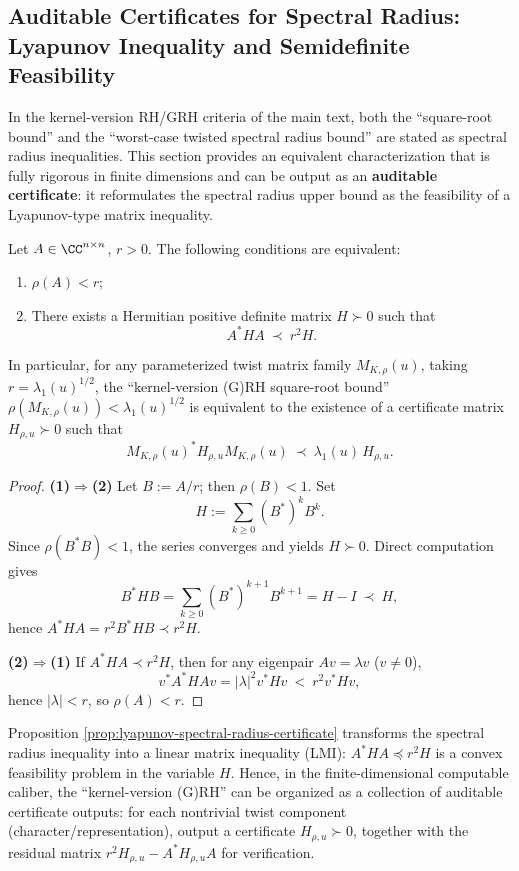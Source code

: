 \subsection{Auditable Certificates for Spectral Radius: Lyapunov Inequality and Semidefinite Feasibility}\label{app:op-algebra-lyapunov}
In the kernel-version RH/GRH criteria of the main text, both the ``square-root bound'' and the ``worst-case twisted spectral radius bound'' are stated as spectral radius inequalities.
This section provides an equivalent characterization that is fully rigorous in finite dimensions and can be output as an \textbf{auditable certificate}: it reformulates the spectral radius upper bound as the feasibility of a Lyapunov-type matrix inequality.

\begin{proposition}\label{prop:lyapunov-spectral-radius-certificate}
Let $A\in\CC^{n\times n}$, $r>0$. The following conditions are equivalent:
\begin{enumerate}
  \item $\rho(A)<r$;
  \item There exists a Hermitian positive definite matrix $H\succ 0$ such that
  \[
  \boxed{\;
  A^\ast H A\ \prec\ r^2 H.
  \;}
  \]
\end{enumerate}
In particular, for any parameterized twist matrix family $M_{K,\rho}(u)$, taking $r=\lambda_1(u)^{1/2}$, the ``kernel-version (G)RH square-root bound''
\(
\rho(M_{K,\rho}(u))<\lambda_1(u)^{1/2}
\)
is equivalent to the existence of a certificate matrix $H_{\rho,u}\succ 0$ such that
\[
M_{K,\rho}(u)^\ast H_{\rho,u} M_{K,\rho}(u)\ \prec\ \lambda_1(u)\,H_{\rho,u}.
\]
\end{proposition}
\begin{proof}
\textbf{(1)$\Rightarrow$(2)} Let $B:=A/r$; then $\rho(B)<1$. Set
\[
H:=\sum_{k\ge 0}(B^\ast)^k B^k.
\]
Since $\rho(B^\ast B)<1$, the series converges and yields $H\succ 0$. Direct computation gives
\[
B^\ast H B
=\sum_{k\ge 0}(B^\ast)^{k+1}B^{k+1}
=H-I\ \prec\ H,
\]
hence $A^\ast H A=r^2 B^\ast H B\prec r^2 H$.

\textbf{(2)$\Rightarrow$(1)} If $A^\ast H A\prec r^2 H$, then for any eigenpair $Av=\lambda v$ ($v\neq 0$),
\[
v^\ast A^\ast H A v=|\lambda|^2 v^\ast H v\ <\ r^2 v^\ast H v,
\]
hence $|\lambda|<r$, so $\rho(A)<r$. \qedhere
\end{proof}

\begin{remark}\label{rem:lyapunov-sdp}
Proposition \ref{prop:lyapunov-spectral-radius-certificate} transforms the spectral radius inequality into a linear matrix inequality (LMI):
\(
A^\ast H A\preceq r^2 H
\)
is a convex feasibility problem in the variable $H$. Hence, in the finite-dimensional computable caliber, the ``kernel-version (G)RH'' can be organized as a collection of auditable certificate outputs:
for each nontrivial twist component (character/representation), output a certificate $H_{\rho,u}\succ 0$, together with the residual matrix
\(
r^2H_{\rho,u}-A^\ast H_{\rho,u}A
\)
for verification.
\end{remark}

